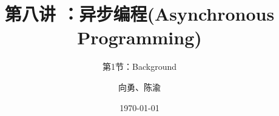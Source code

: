 


\title[第8讲]{第八讲 ：异步编程(Asynchronous Programming)} %
\subtitle{第1节：Background}
\author{向勇、陈渝} %
\date{\today} %



\begin{frame}
\titlepage %
\end{frame}

